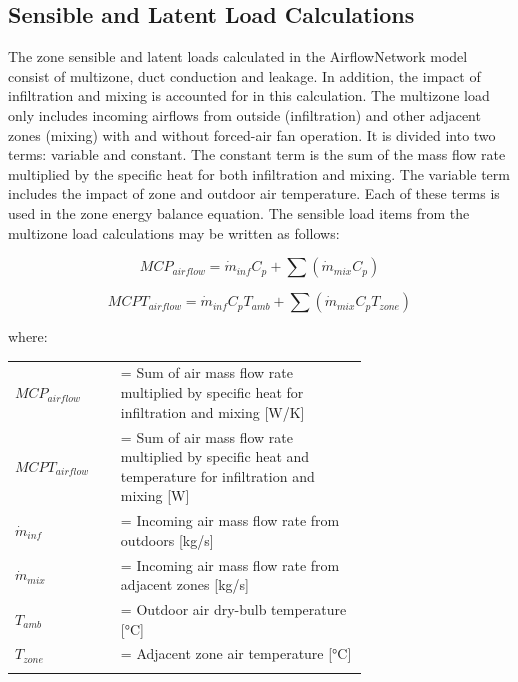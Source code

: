 \subsection{Sensible and Latent Load Calculations}\label{sensible-and-latent-load-calculations}

The zone sensible and latent loads calculated in the AirflowNetwork model consist of multizone, duct conduction and leakage. In addition, the impact of infiltration and mixing is accounted for in this calculation. The multizone load only includes incoming airflows from outside (infiltration) and other adjacent zones (mixing) with and without forced-air fan operation. It is divided into two terms: variable and constant. The constant term is the sum of the mass flow rate multiplied by the specific heat for both infiltration and mixing. The variable term includes the impact of zone and outdoor air temperature. Each of these terms is used in the zone energy balance equation. The sensible load items from the multizone load calculations may be written as follows:

\begin{equation}
MCP_{airflow} = \dot{m}_{inf} {C_p} + \sum \left( {\dot{m}_{mix} C_p} \right)
\end{equation}

\begin{equation}
MCPT_{airflow} = \dot{m}_{inf} C_p T_{amb} + \sum \left( \dot{m}_{mix} C_p T_{zone} \right)
\end{equation}

where:

\begin{tabular}{lp{0.7\linewidth}}
\\
$MCP_{airflow}$ &= Sum of air mass flow rate multiplied by specific heat for infiltration and mixing [W/K]\\
$MCPT_{airflow}$ &= Sum of air mass flow rate multiplied by specific heat and temperature for infiltration and mixing [W]\\
$\dot{m}_{inf}$ &= Incoming air mass flow rate from outdoors [kg/s]\\
$\dot{m}_{mix}$ &= Incoming air mass flow rate from adjacent zones [kg/s]\\
$T_{amb}$ &= Outdoor air dry-bulb temperature [°C]\\
$T_{zone}$ &= Adjacent zone air temperature [°C]\\
\\
\end{tabular}

